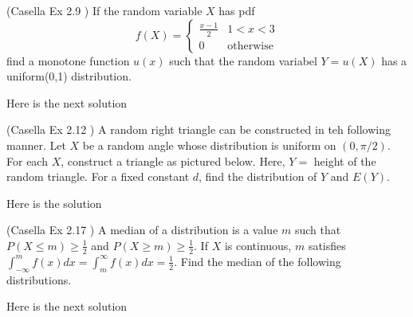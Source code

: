 \documentclass[12pt,letterpaper]{exam}
\begin{document}
\begin{questions}
	\setcounter{question}{8}
	\question  (Casella Ex 2.9 ) If the random variable $X$ has pdf $$f(X) = \begin{cases}\frac{x-1}{2} & 1<x<3 \\ 0 & \text{otherwise} \end{cases}$$
	find a monotone function $u(x)$ such that the random variabel $Y = u(X)$ has a uniform(0,1) distribution.
	\begin{solution}
		Here is the next solution
	\end{solution}

	\setcounter{question}{11}
	\question (Casella Ex 2.12 ) A random right triangle can be constructed in teh following manner. Let $X$ be a random angle whose distribution is uniform on $(0, \pi / 2)$. For each $X$, construct a triangle as pictured below. Here, $Y =$ height of the random triangle. For a fixed constant $d$, find the distribution of $Y$ and $E(Y)$. 
	\begin{center}
	\end{center}
	
	\begin{solution}
		Here is the solution
	\end{solution}
	
	\setcounter{question}{16}
	\question  (Casella Ex 2.17 ) A median of a distribution is a value $m$ such that $P(X \le m) \ge \frac{1}{2}$ and $P(X \ge m) \ge \frac{1}{2}$.
	If $X$ is continuous, $m$ satisfies $\int_{-\infty}^{m} f(x) dx = \int_{m}^{\infty} f(x) dx = \frac{1}{2}$. Find the median of the following distributions.
	
	\begin{solution}
		Here is the next solution
	\end{solution}


\end{questions}
\end{document}
